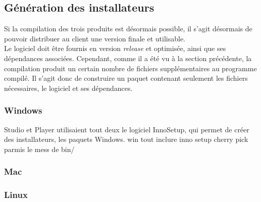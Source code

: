 \subsection{Génération des installateurs}
Si la compilation des trois produits est désormais possible, il s'agit désormais
de pouvoir distribuer au client une version finale et utilisable.\\
Le logiciel doit être fournis en version \textit{release} et optimisée, ainsi que ses dépendances associées.
Cependant, comme il a été vu à la section précédente, la compilation produit un
certain nombre de fichiers supplémentaires au programme compilé. Il s'agit donc
de construire un paquet contenant seulement les fichiers nécessaires, le logiciel
et ses dépendances.

\subsubsection{Windows}
Studio et Player utilisaient tout deux le logiciel InnoSetup, qui permet de créer des
installateurs, les paquets Windows. 
win tout inclure inno setup cherry pick parmis le mess de bin/

\subsubsection{Mac}

\subsubsection{Linux}


